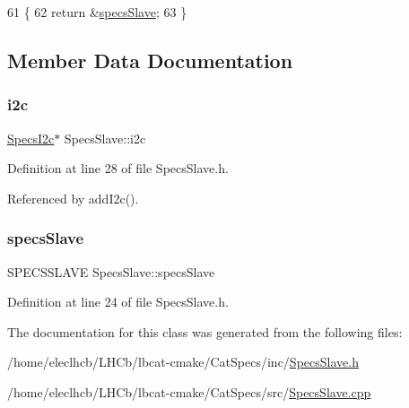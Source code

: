 \begin{DoxyCode}
61                                         \{
62   \textcolor{keywordflow}{return} &\hyperlink{classSpecsInterface_a13cf39bddfa8ba21d6e6aa78e78f0e4f}{specsSlave};
63 \}
\end{DoxyCode}


\subsection{Member Data Documentation}
\mbox{\label{classSpecsSlave_a5210e5a45c381ee29a830b42119ec1d3}} 
\subsubsection{\texorpdfstring{i2c}{i2c}}
{\footnotesize\ttfamily \hyperlink{classSpecsI2c}{Specs\+I2c}$\ast$ Specs\+Slave\+::i2c\hspace{0.3cm}{\ttfamily [protected]}}



Definition at line 28 of file Specs\+Slave.\+h.



Referenced by add\+I2c().

\mbox{\label{classSpecsSlave_a98f0190d671023c3d874088ea2bd874b}} 
\subsubsection{\texorpdfstring{specs\+Slave}{specsSlave}}
{\footnotesize\ttfamily S\+P\+E\+C\+S\+S\+L\+A\+VE Specs\+Slave\+::specs\+Slave\hspace{0.3cm}{\ttfamily [private]}}



Definition at line 24 of file Specs\+Slave.\+h.



The documentation for this class was generated from the following files\+:\begin{DoxyCompactItemize}
\item 
/home/eleclhcb/\+L\+H\+Cb/lbcat-\/cmake/\+Cat\+Specs/inc/\hyperlink{SpecsSlave_8h}{Specs\+Slave.\+h}\item 
/home/eleclhcb/\+L\+H\+Cb/lbcat-\/cmake/\+Cat\+Specs/src/\hyperlink{SpecsSlave_8cpp}{Specs\+Slave.\+cpp}\end{DoxyCompactItemize}
